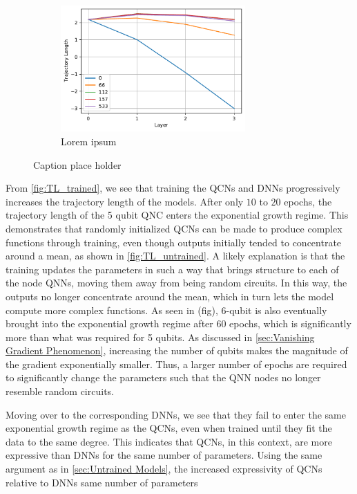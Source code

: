 \begin{figure}[H]
\begin{subfigure}[t]{0.5\textwidth}
    \end{subfigure}%
    \hfill 
    \begin{subfigure}[t]{0.5\textwidth}
        \centering
        \includegraphics[height=1.9in]{latex/figures/TL_trained_DNN_nodes_9.pdf}
        \caption{Lorem ipsum}
    \end{subfigure}
    \caption{Caption place holder}
    \label{fig:TL_trained}
\end{figure}

From \autoref{fig:TL_trained}, we see that training the QCNs and DNNs progressively increases the trajectory length of the models. After only $10$ to $20$ epochs, the trajectory length of the 5 qubit QNC enters the exponential growth regime. This demonstrates that randomly initialized QCNs can be made to produce complex functions through training, even though outputs initially tended to concentrate around a mean, as shown in \autoref{fig:TL_untrained}. A likely explanation is that the training updates the parameters in such a way that brings structure to each of the node QNNs, moving them away from being random circuits. In this way, the outputs no longer concentrate around the mean, which in turn lets the model compute more complex functions. As seen in (fig), 6-qubit is also eventually brought into the exponential growth regime after $60$ epochs, which is significantly more than what was required for 5 qubits. As discussed in \autoref{sec:Vanishing Gradient Phenomenon}, increasing the number of qubits makes the magnitude of the gradient exponentially smaller. Thus, a larger number of epochs are required to significantly change the parameters such that the QNN nodes no longer resemble random circuits.

Moving over to the corresponding DNNs, we see that they fail to enter the same exponential growth regime as the QCNs, even when trained until they fit the data to the same degree. This indicates that QCNs, in this context, are more expressive than DNNs for the same number of parameters. Using the same argument as in \autoref{sec:Untrained Models}, the increased expressivity of QCNs relative to DNNs same number of parameters 

